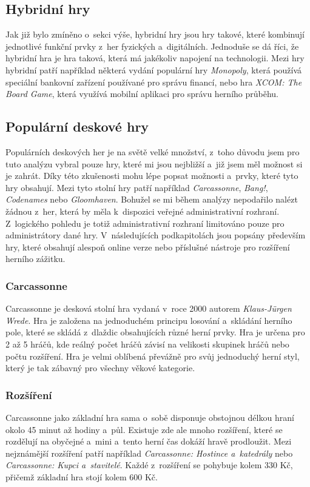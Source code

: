 \subsection*{Hybridní hry}
\label{subsec:popular-board-games-analysis-hybrid-games}
Jak již bylo zmíněno o~sekci výše, hybridní hry jsou hry takové, které kombinují jednotlivé funkční prvky z~her fyzických a~digitálních. Jednoduše se dá říci, že hybridní hra je hra taková, která má jakékoliv napojení na technologii. Mezi hry hybridní patří například některá vydání populární hry \textit{Monopoly}, která používá speciální bankovní zařízení používané pro správu financí, nebo hra \textit{XCOM: The Board Game}, která využívá mobilní aplikaci pro správu herního průběhu.

\subsection{Populární deskové hry}
\label{subsec:popular-board-games-analysis-popular-games}
Populárních deskových her je na světě velké množství, z~toho důvodu jsem pro tuto analýzu vybral pouze hry, které mi jsou nejbližší a~již jsem měl možnost si je zahrát. Díky této zkušenosti mohu lépe popsat možnosti a~prvky, které tyto hry obsahují. Mezi tyto stolní hry patří například \textit{Carcassonne}, \textit{Bang!}, \textit{Codenames} nebo \textit{Gloomhaven}. Bohužel se mi během analýzy nepodařilo nalézt žádnou z~her, která by měla k~dispozici veřejné administrativní rozhraní. Z~logického pohledu je totiž administrativní rozhraní limitováno pouze pro administrátory dané hry. V~následujících podkapitolách jsou popsány především hry, které obsahují alespoň online verze nebo příslušné nástroje pro rozšíření herního zážitku.

\subsubsection{Carcassonne}
\label{subsubsec:popular-board-games-analysis-carcassonne}
Carcassonne je desková stolní hra vydaná v~roce 2000 autorem \textit{Klaus-Jürgen Wrede}. Hra je založena na jednoduchém principu losování a~skládání herního pole, které se skládá z~dlaždic obsahujících různé herní prvky. Hra je určena pro 2 až 5 hráčů, kde reálný počet hráčů závisí na velikosti skupinek hráčů nebo počtu rozšíření. Hra je velmi oblíbená převážně pro svůj jednoduchý herní styl, který je tak zábavný pro všechny věkové kategorie.

\subsubsection*{Rozšíření}
\label{subsubsec:popular-board-games-analysis-carcassonne-expansions}
Carcassonne jako základní hra sama o~sobě disponuje obstojnou délkou hraní okolo 45 minut až hodiny a~půl. Existuje zde ale mnoho rozšíření, které se rozdělují na obyčejné a~mini a~tento herní čas dokáží hravě prodloužit. Mezi nejznámější rozšíření patří například \textit{Carcassonne: Hostince a~katedrály} nebo \textit{Carcassonne: Kupci a~stavitelé}. Každé z~rozšíření se pohybuje kolem 330 Kč, přičemž základní hra stojí kolem 600 Kč.

